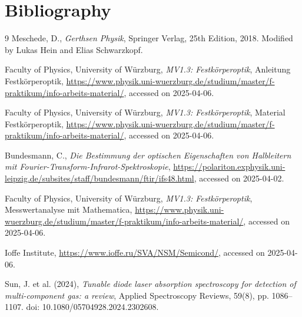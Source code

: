\section{Bibliography}
\begin{thebibliography}{9}
    Meschede, D., \emph{Gerthsen Physik}, Springer Verlag, 25th Edition, 2018. Modified by Lukas Hein
    and Elias Schwarzkopf.
    
    Faculty of Physics, University of Würzburg, \emph{MV1.3: Festkörperoptik}, Anleitung Festkörperoptik,
    \url{https://www.physik.uni-wuerzburg.de/studium/master/f-praktikum/info-arbeits-material/},
    accessed on 2025-04-06.
    
    Faculty of Physics, University of Würzburg, \emph{MV1.3: Festkörperoptik}, Material Festkörperoptik,
    \url{https://www.physik.uni-wuerzburg.de/studium/master/f-praktikum/info-arbeits-material/},
    accessed on 2025-04-06.
    
    Bundesmann, C., \emph{Die Bestimmung der optischen Eigenschaften von Halbleitern mit Fourier-Transform-Infrarot-Spektroskopie},
    \url{https://polariton.exphysik.uni-leipzig.de/subsites/staff/bundesmann/ftir/ifs48.html}, accessed on 2025-04-02.
    
    Faculty of Physics, University of Würzburg, \emph{MV1.3: Festkörperoptik}, Messwertanalyse mit Mathematica,
    \url{https://www.physik.uni-wuerzburg.de/studium/master/f-praktikum/info-arbeits-material/},
    accessed on 2025-04-06.
    
    Ioffe Institute, \url{https://www.ioffe.ru/SVA/NSM/Semicond/}, accessed on 2025-04-06.
    
    Sun, J. et al. (2024), \emph{Tunable diode laser absorption spectroscopy for detection of multi-component gas: 
    a review}, Applied Spectroscopy Reviews, 59(8), pp. 1086–1107. doi: 10.1080/05704928.2024.2302608.
\end{thebibliography}
